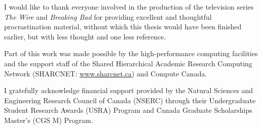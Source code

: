 
I would like to thank everyone involved in the production of the television series \emph{The Wire} and \emph{Breaking Bad} for providing excellent and thoughtful procrastination material, without which this thesis would have been finished earlier, but with less thought and one less reference.

Part of this work was made possible by the high-performance computing facilities and the support staff of the Shared Hierarchical Academic Research Computing Network (SHARCNET: \href{www.sharcnet.ca}{www.sharcnet.ca}) and Compute Canada.

I gratefully acknowledge financial support provided by the Natural Sciences and Engineering Research Council of Canada (NSERC) through their Undergraduate Student Research Awards (USRA) Program and Canada Graduate Scholarships Master's (CGS M) Program.

\endgroup